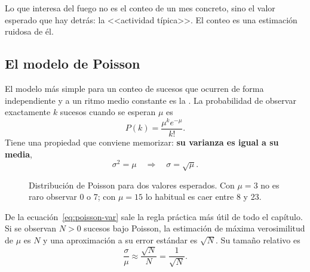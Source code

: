 Lo que interesa del fuego no es el conteo de un mes concreto, sino el valor esperado que hay
detrás: la <<actividad típica>>. El conteo es una estimación ruidosa de él.

\subsection{El modelo de Poisson}

El modelo más simple para un conteo de sucesos que ocurren de forma independiente y a un ritmo
medio constante es la . La probabilidad de observar exactamente
$k$ sucesos cuando se esperan $\mu$ es
\begin{equation}
  P(k) = \frac{\mu^k e^{-\mu}}{k!} .
\end{equation}
Tiene una propiedad que conviene memorizar: \textbf{su varianza es igual a su media},
\begin{equation}\label{eq:poisson-var}
  \sigma^2 = \mu \quad\Longrightarrow\quad \sigma = \sqrt{\mu}.
\end{equation}

\begin{figure}[ht]
\centering
{}
\caption{Distribución de Poisson para dos valores esperados. Con $\mu = 3$ no es raro observar
0 o 7; con $\mu = 15$ lo habitual es caer entre 8 y 23.}
\label{fig:poisson}
\end{figure}

De la ecuación~\eqref{eq:poisson-var} sale la regla práctica más útil de todo el capítulo. Si
se observan $N>0$ sucesos bajo Poisson, la estimación de máxima verosimilitud de $\mu$
es $N$ y una aproximación a su error estándar es $\sqrt{N}$. Su tamaño relativo es
\begin{equation}\label{eq:rel}
  \frac{\sigma}{\mu} \approx \frac{\sqrt{N}}{N} = \frac{1}{\sqrt{N}} .
\end{equation}

